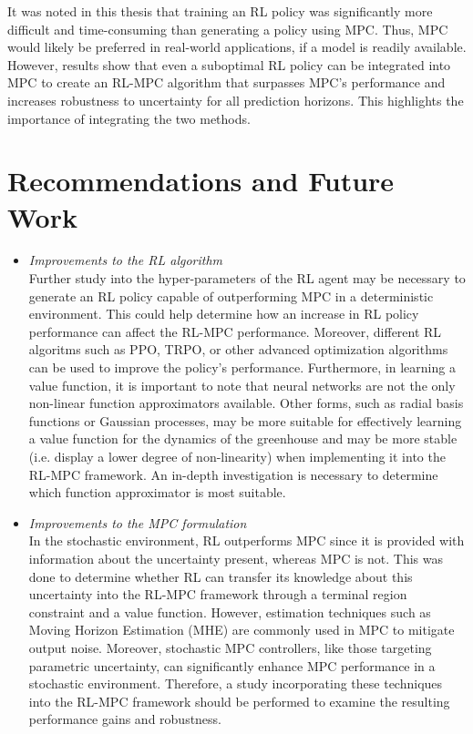 It was noted in this thesis that training an RL policy was significantly more difficult and time-consuming than generating a policy using MPC. Thus, MPC would likely be preferred in real-world applications, if a model is readily available. However, results show that even a suboptimal RL policy can be integrated into MPC to create an RL-MPC algorithm that surpasses MPC's performance and increases robustness to uncertainty for all prediction horizons. This highlights the importance of integrating the two methods.


\section{Recommendations and Future Work}

\begin{itemize}
	\item \textit{Improvements to the RL algorithm}
	\\Further study into the hyper-parameters of the RL agent may be necessary to generate an RL policy capable of outperforming MPC in a deterministic environment. This could help determine how an increase in RL policy performance can affect the RL-MPC performance.  Moreover, different RL algoritms such as PPO, TRPO, or other advanced optimization algorithms  can be used to improve the policy's performance. Furthermore, in learning a value function, it is important to note that neural networks are not the only non-linear function approximators available. Other forms, such as radial basis functions or Gaussian processes, may be more suitable for effectively learning a value function for the dynamics of the greenhouse and may be more stable (i.e. display a lower degree of non-linearity) when implementing it into the RL-MPC framework. An in-depth investigation is necessary to determine which function approximator is most suitable.
	
	\item \textit{Improvements to the MPC formulation}
	\\In the stochastic environment, RL outperforms MPC since it is provided with information about the uncertainty present, whereas MPC is not. This was done to determine whether RL can transfer its knowledge about this uncertainty into the RL-MPC framework through a terminal region constraint and a value function. However, estimation techniques such as Moving Horizon Estimation (MHE) are commonly used in MPC to mitigate output noise. Moreover, stochastic MPC controllers, like those targeting parametric uncertainty, can significantly enhance MPC performance in a stochastic environment. Therefore, a study incorporating these techniques into the RL-MPC framework should be performed to examine the resulting performance gains and robustness.
	

\end{itemize}
